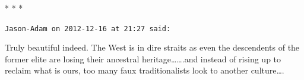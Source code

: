 
\begin{center}* * *\end{center}

\begin{footnotesize}\begin{sffamily}



\texttt{Jason-Adam on 2012-12-16 at 21:27 said: }

Truly beautiful indeed. The West is in dire straits as even the descendents of the former elite are losing their ancestral heritage…….and instead of rising up to reclaim what is ours, too many faux traditionalists look to another culture….


\end{sffamily}\end{footnotesize}
